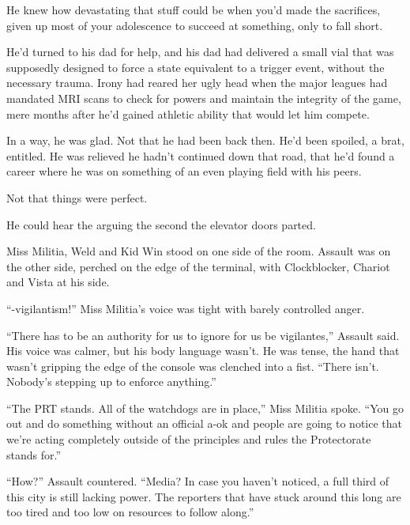 He knew how devastating that stuff could be when you'd made the sacrifices, given up most of your adolescence to succeed at something, only to fall short.



He'd turned to his dad for help, and his dad had delivered a small vial that was supposedly designed to force a state equivalent to a trigger event, without the necessary trauma.  Irony had reared her ugly head when the major leagues had mandated MRI scans to check for powers and maintain the integrity of the game, mere months after he'd gained athletic ability that would let him compete.



In a way, he was glad.  Not that he had been back then.  He'd been spoiled, a brat, entitled.  He was relieved he hadn't continued down that road, that he'd found a career where he was on something of an even playing field with his peers.



Not that things were perfect.



He could hear the arguing the second the elevator doors parted.



Miss Militia, Weld and Kid Win stood on one side of the room.  Assault was on the other side, perched on the edge of the terminal, with Clockblocker, Chariot and Vista at his side.



``-vigilantism!''  Miss Militia's voice was tight with barely controlled anger.



``There has to be an authority for us to ignore for us be vigilantes,'' Assault said.  His voice was calmer, but his body language wasn't.  He was tense, the hand that wasn't gripping the edge of the console was clenched into a fist.  ``There isn't.  Nobody's stepping up to enforce anything.''



``The PRT stands.  All of the watchdogs are in place,'' Miss Militia spoke.  ``You go out and do something without an official a-ok and people are going to notice that we're acting completely outside of the principles and rules the Protectorate stands for.''



``How?'' Assault countered.  ``Media?  In case you haven't noticed, a full third of this city is still lacking power.  The reporters that have stuck around this long are too tired and too low on resources to follow along.''



